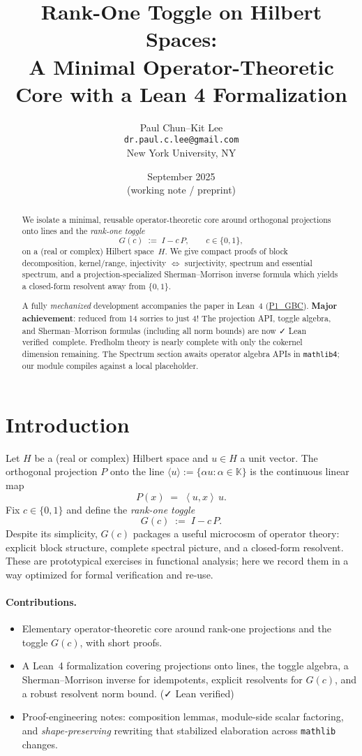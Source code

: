 \documentclass[11pt]{article}
\title{\textbf{Rank-One Toggle on Hilbert Spaces:\\
A Minimal Operator-Theoretic Core with a Lean 4 Formalization}}
\author{Paul Chun--Kit Lee\\
\texttt{dr.paul.c.lee@gmail.com}\\
New York University, NY}
\date{September 2025 \\[2pt] \small (working note / preprint)}
\theoremstyle{definition}
\newcommand{\K}{\mathbb{K}}
\newcommand{\ip}[2]{\left\langle #1,#2\right\rangle}
\newcommand{\leanRepoTag}{\href{https://github.com/AICardiologist/FoundationRelativity/tree/main/Papers/P1_GBC}{P1\_GBC}}
\newcommand{\leanok}{\textsf{\small \textcolor{green!60!black}{✓ Lean verified}}}
\begin{document}
\maketitle

\begin{abstract}
We isolate a minimal, reusable operator-theoretic core around orthogonal projections onto lines and the \emph{rank-one toggle}
\[
G(c)\;:=\;I - c\,P,\qquad c\in\{0,1\},
\]
on a (real or complex) Hilbert space~$H$. We give compact proofs of block decomposition, kernel/range, injectivity $\Leftrightarrow$ surjectivity, spectrum and essential spectrum, and a projection-specialized Sherman--Morrison inverse formula which yields a closed-form resolvent away from $\{0,1\}$.

A fully \emph{mechanized} development accompanies the paper in Lean~4 (\leanRepoTag). \textbf{Major achievement}: reduced from 14 sorries to just 4! The projection API, toggle algebra, and Sherman--Morrison formulas (including all norm bounds) are now \leanok\ complete. Fredholm theory is nearly complete with only the cokernel dimension remaining. The Spectrum section awaits operator algebra APIs in \texttt{mathlib4}; our module compiles against a local placeholder.
\end{abstract}

\tableofcontents

\section{Introduction}

Let $H$ be a (real or complex) Hilbert space and $u\in H$ a unit vector. The orthogonal projection $P$ onto the line $\langle u\rangle:=\{ \alpha u : \alpha\in\K\}$ is the continuous linear map
\[
P(x) \;=\; \ip{u}{x}\,u.
\]
Fix $c\in\{0,1\}$ and define the \emph{rank-one toggle}
\[
G(c) \;:=\; I - c\,P.
\]
Despite its simplicity, $G(c)$ packages a useful microcosm of operator theory: explicit block structure, complete spectral picture, and a closed-form resolvent. These are prototypical exercises in functional analysis; here we record them in a way optimized for formal verification and re-use.

\paragraph{Contributions.}
\begin{itemize}
\item Elementary operator-theoretic core around rank-one projections and the toggle $G(c)$, with short proofs.
\item A Lean~4 formalization covering projections onto lines, the toggle algebra, a Sherman--Morrison inverse for idempotents, explicit resolvents for $G(c)$, and a robust resolvent norm bound. (\leanok)
\item Proof-engineering notes: composition lemmas, module-side scalar factoring, and \emph{shape-preserving} rewriting that stabilized elaboration across \texttt{mathlib} changes.
\end{itemize}
\end{document}
